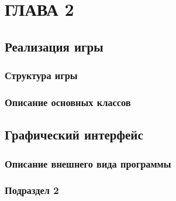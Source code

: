 \chapter{\label{ch:ch02}ГЛАВА 2}

\section{\label{sec:ch02/sec01}Реализация игры}

\subsection{\label{subsec:ch02/sec01/sub01}Структура игры}


\subsection{\label{subsec:ch02/sec01/sub02}Описание основных классов}

\section{\label{sec:ch02/sec02}Графический интерфейс}

\subsection{\label{subsec:ch02/sec02/sub01}Описание внешнего вида программы}

\subsection{\label{subsec:ch02/sec02/sub02}Подраздел 2}


